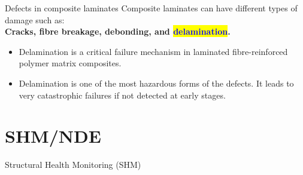 \documentclass[10pt,aspectratio=169]{beamer} %
\begin{document}
\begin{frame}{Defects in composite laminates}
	\small
	Composite laminates can have different types of damage such as: \\
	\textbf{Cracks, fibre breakage, debonding, and \colorbox{yellow}{\textcolor{blue}{delamination}}.} \\ 
	\begin{minipage}[c]{.40\textwidth}
		\begin{itemize}
			\footnotesize
			\item Delamination is a critical failure mechanism in laminated fibre-reinforced polymer matrix composites.
			\item Delamination is one of the most hazardous forms of the defects. 
			It leads to very catastrophic failures if not detected at early stages.
		\end{itemize}
	\end{minipage}
	\hfill
	\begin{minipage}[c]{0.50\textwidth}
		\begin{figure}
		\end{figure}
	\end{minipage}
\end{frame}

\section{SHM/NDE}
\begin{frame}{Structural Health Monitoring (SHM)}
	\begin{figure}
	\end{figure}
\end{frame}
\end{document}
